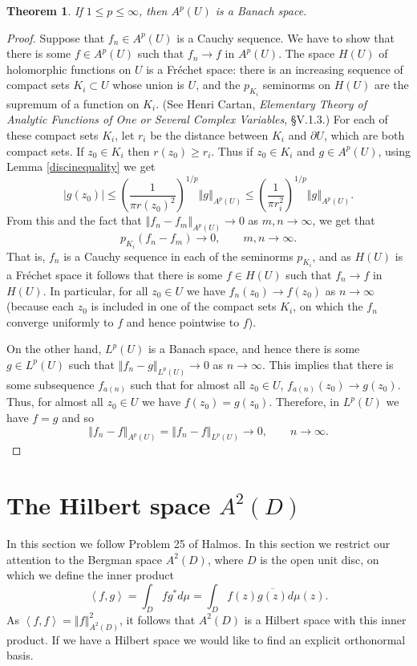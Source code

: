 \documentclass{article}
\newcommand{\inner}[2]{\left\langle #1, #2 \right\rangle}
\newcommand{\norm}[1]{\left\Vert #1 \right\Vert}
\newtheorem{theorem}{Theorem}
\begin{document}
\begin{theorem}
If $1 \leq p \leq \infty$, then $A^p(U)$ is a Banach space.
\label{bergmanbanach}
\end{theorem}
\begin{proof}
Suppose that $f_n \in A^p(U)$ is a Cauchy sequence. We have to show that there is some $f \in A^p(U)$ such that $f_n \to f$ in $A^p(U)$. The space $H(U)$ of holomorphic functions
on $U$ is a Fr\'echet space: there is an increasing sequence of compact sets $K_i \subset U$ whose union is $U$, and the $p_{K_i}$ seminorms on $H(U)$ are the supremum of a function
on $K_i$. (See Henri Cartan, {\em Elementary Theory of Analytic Functions of One or Several Complex Variables}, \S V.1.3.) For each of these compact sets $K_i$, 
let $r_i$ be the distance between $K_i$ and $\partial U$, which are both compact sets. If $z_0 \in K_i$ then
$r(z_0) \geq r_i$. Thus if  $z_0 \in K_i$ and  $g \in A^p(U)$, using Lemma \ref{discinequality} we get
\[
|g(z_0)| \leq \left(\frac{1}{\pi r(z_0)^2}\right)^{1/p} \norm{g}_{A^p(U)} \leq  \left(\frac{1}{\pi r_i^2}\right)^{1/p} \norm{g}_{A^p(U)}.
\]
From this and the fact that $\norm{f_n-f_m}_{A^p(U)} \to 0$ as $m,n \to \infty$, we get that
\[
p_{K_i}(f_n-f_m) \to 0, \qquad m,n \to \infty.
\]
That is, $f_n$ is a Cauchy sequence in each of the seminorms $p_{K_i}$, and as $H(U)$ is a Fr\'echet space it follows that there is some $f \in H(U)$ such that
$f_n \to f$ in $H(U)$. In particular, for all $z_0 \in U$ we have $f_n(z_0) \to f(z_0)$ as $n \to \infty$ (because each $z_0$ is included in one of the compact sets $K_i$, on which
the $f_n$ converge uniformly to $f$ and hence pointwise to $f$).

On the other hand, $L^p(U)$ is a Banach space, and hence there is some $g \in L^p(U)$ such that $\norm{f_n-g}_{L^p(U)} \to 0$ as $n \to \infty$.
This implies that there is some subsequence $f_{a(n)}$ such that 
for almost all $z_0 \in U$, $f_{a(n)}(z_0) \to g(z_0)$. Thus, for almost all $z_0 \in U$ we have $f(z_0)=g(z_0)$. Therefore, in $L^p(U)$ we have $f=g$ and so 
\[
\norm{f_n-f}_{A^p(U)} = \norm{f_n-f}_{L^p(U)} \to 0, \qquad n \to \infty.
\]
\end{proof}



\section{The Hilbert space $A^2(D)$}
In this section we follow Problem 25 of Halmos.
In this section we restrict our attention to the Bergman space $A^2(D)$, where $D$ is the open unit disc,
on which we define the inner product
\[
\inner{f}{g}=\int_D f g^* d\mu = \int_D f(z) \overline{g(z)} d\mu(z).
\]
As $\inner{f}{f}=\norm{f}_{A^2(D)}^2$, it follows that $A^2(D)$ is a Hilbert space with this inner product. If we have a Hilbert space we would like to find an explicit orthonormal basis.
\end{document}
